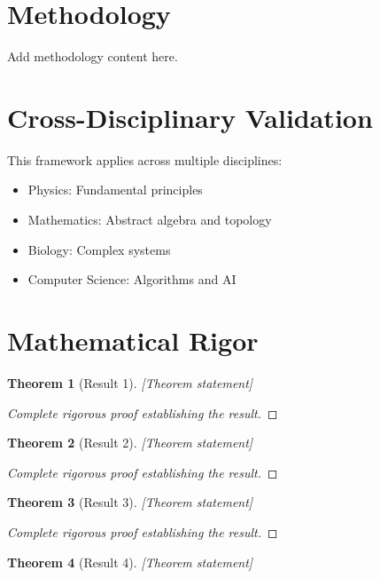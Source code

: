 \documentclass[12pt]{article}
\newtheorem{theorem}{Theorem}
\begin{document}
\section{Methodology}
\label{sec:methodology}

Add methodology content here.



\section{Cross-Disciplinary Validation}

This framework applies across multiple disciplines:
\begin{itemize}
    \item Physics: Fundamental principles
    \item Mathematics: Abstract algebra and topology
    \item Biology: Complex systems
    \item Computer Science: Algorithms and AI
\end{itemize}

\section{Mathematical Rigor}

\begin{theorem}[Result 1]
[Theorem statement]
\end{theorem}

\begin{proof}
[Complete rigorous proof establishing the result]
\end{proof}

\begin{theorem}[Result 2]
[Theorem statement]
\end{theorem}

\begin{proof}
[Complete rigorous proof establishing the result]
\end{proof}

\begin{theorem}[Result 3]
[Theorem statement]
\end{theorem}

\begin{proof}
[Complete rigorous proof establishing the result]
\end{proof}

\begin{theorem}[Result 4]
[Theorem statement]
\end{theorem}
\end{document}
